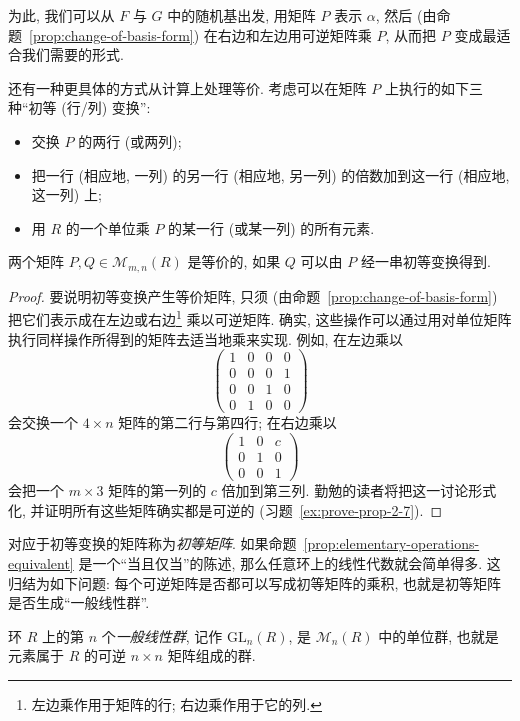为此, 我们可以从 $F$ 与 $G$ 中的随机基出发, 用矩阵 $P$ 表示 $\alpha$, 然后 (由命题~\ref{prop:change-of-basis-form}) 在右边和左边用可逆矩阵乘 $P$, 从而把 $P$ 变成最适合我们需要的形式.

还有一种更具体的方式从计算上处理等价. 考虑可以在矩阵 $P$ 上执行的如下三种``初等 (行/列) 变换'':
\begin{itemize}
\item 交换 $P$ 的两行 (或两列);
\item 把一行 (相应地, 一列) 的另一行 (相应地, 另一列) 的倍数加到这一行 (相应地, 这一列) 上;
\item 用 $R$ 的一个单位乘 $P$ 的某一行 (或某一列) 的所有元素.
\end{itemize}

\begin{proposition}\label{prop:elementary-operations-equivalent}
两个矩阵 $P,Q\in\mathcal{M}_{m,n}(R)$ 是等价的, 如果 $Q$ 可以由 $P$ 经一串初等变换得到.
\end{proposition}

\begin{proof}
要说明初等变换产生等价矩阵, 只须 (由命题~\ref{prop:change-of-basis-form}) 把它们表示成在左边或右边\footnote{左边乘作用于矩阵的行; 右边乘作用于它的列.} 乘以可逆矩阵. 确实, 这些操作可以通过用对单位矩阵执行同样操作所得到的矩阵去适当地乘来实现. 例如, 在左边乘以
\[
\begin{pmatrix}
1 & 0 & 0 & 0\\
0 & 0 & 0 & 1\\
0 & 0 & 1 & 0\\
0 & 1 & 0 & 0
\end{pmatrix}
\]
会交换一个 $4\times n$ 矩阵的第二行与第四行; 在右边乘以
\[
\begin{pmatrix}
1 & 0 & c\\
0 & 1 & 0\\
0 & 0 & 1
\end{pmatrix}
\]
会把一个 $m\times 3$ 矩阵的第一列的 $c$ 倍加到第三列. 勤勉的读者将把这一讨论形式化, 并证明所有这些矩阵确实都是可逆的 (习题~\ref{ex:prove-prop-2-7}).
\end{proof}

对应于初等变换的矩阵称为\emph{初等矩阵}. 如果命题~\ref{prop:elementary-operations-equivalent} 是一个``当且仅当''的陈述, 那么任意环上的线性代数就会简单得多. 这归结为如下问题: 每个可逆矩阵是否都可以写成初等矩阵的乘积, 也就是初等矩阵是否生成``一般线性群''.

\begin{definition}\label{def:general-linear-group}
环 $R$ 上的第 $n$ 个\emph{一般线性群}, 记作 $\mathrm{GL}_n(R)$, 是 $\mathcal{M}_n(R)$ 中的单位群, 也就是元素属于 $R$ 的可逆 $n\times n$ 矩阵组成的群.
\end{definition}

